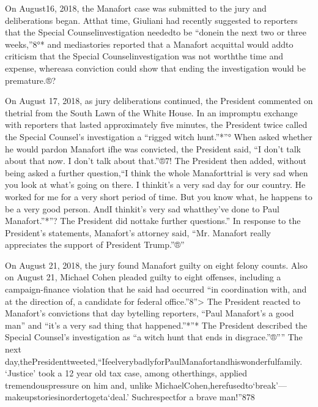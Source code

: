 On August16, 2018, the Manafort case was submitted to the jury and deliberations began. Atthat time, Giuliani had recently suggested to reporters that the Special Counselinvestigation neededto be “donein the next two or three weeks,”8°* and mediastories reported that a Manafort acquittal would addto criticism that the Special Counselinvestigation was not worththe time and expense, whereasa conviction could show that ending the investigation would be premature.®?

On August 17, 2018, as jury deliberations continued, the President commented on thetrial from the South Lawn of the White House. In an impromptu exchange with reporters that lasted approximately five minutes, the President twice called the Special Counsel’s investigation a “rigged witch hunt.”*”° When asked whether he would pardon Manafort ifhe was convicted, the President said, “I don’t talk about that now. I don’t talk about that.”®7! The President then added, without being asked a further question,“I think the whole Manaforttrial is very sad when you look at what’s going on there. I thinkit’s a very sad day for our country. He worked for me for a very short period of time. But you know what, he happens to be a very good person. AndI thinkit’s very sad whatthey’ve done to Paul Manafort.”*”? The President did nottake further questions.” In response to the President’s statements, Manafort’s attorney said, “Mr. Manafort really appreciates the support of President Trump.”®”

On August 21, 2018, the jury found Manafort guilty on eight felony counts. Also on August 21, Michael Cohen pleaded guilty to eight offenses, including a campaign-finance violation that he said had occurred “in coordination with, and at the direction of, a candidate for federal office.”8”> The President reacted to Manafort’s convictions that day bytelling reporters, “Paul Manafort’s a good man” and “it’s a very sad thing that happened.”*”* The President described the Special Counsel’s investigation as “a witch hunt that ends in disgrace.”®”” The next day,thePresidenttweeted,“IfeelverybadlyforPaulManafortandhiswonderfulfamily. ‘Justice’ took a 12 year old tax case, among otherthings, applied tremendouspressure on him and, unlike MichaelCohen,herefusedto‘break’—makeupstoriesinordertogeta‘deal.’ Suchrespectfor a brave man!”878

